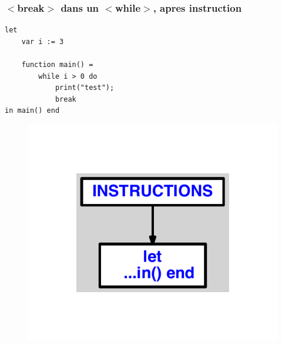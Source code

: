 \documentclass{article}
\begin{document}
\subsubsection{$ < $break$ > $ dans un $ < $while$ > $, apres instruction}
\begin{lstlisting}
let
	var i := 3

	function main() =
		while i > 0 do
			print("test");
			break
in main() end
\end{lstlisting}
\newpage
\begin{figure}[H]
\centering
\includegraphics[max width=\textwidth]{ast/ast_14.pdf}
\end{figure}
\newpage
\end{document}
